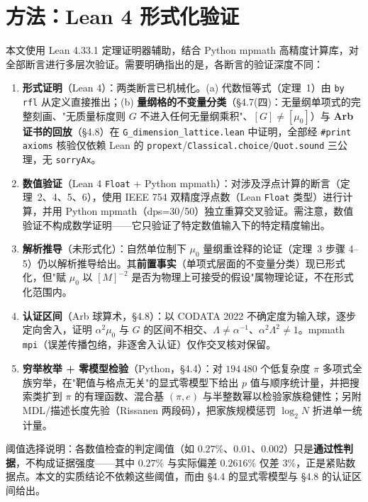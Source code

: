 \documentclass[12pt,a4paper]{article}
\begin{document}
\section{方法：Lean 4 形式化验证}

本文使用 Lean 4.33.1 定理证明器\cite{lean4}辅助，结合 Python mpmath 高精度计算库\cite{mpmath}，对全部断言进行多层次验证。需要明确指出的是，各断言的验证深度不同：

\begin{enumerate}
  \item \textbf{形式证明}（Lean 4）：两类断言已机械化。(a) 代数恒等式（定理~1）由 \texttt{by rfl} 从定义直接推出；(b) \textbf{量纲格的不变量分类}（§4.7(四)：无量纲单项式的完整刻画、"无质量标度则 $G$ 不进入任何无量纲乘积"、$[G]\neq[\mu_0]$）与 \textbf{Arb 证书的回放}（§4.8）在 \texttt{G\_\allowbreak{}dimension\_\allowbreak{}lattice.lean} 中证明，全部经 \texttt{\#print axioms} 核验仅依赖 Lean 的 \texttt{propext}/\texttt{Classical.choice}/\texttt{Quot.sound} 三公理，无 \texttt{sorryAx}。
  \item \textbf{数值验证}（Lean 4 \texttt{Float} + Python mpmath）：对涉及浮点计算的断言（定理~2、4、5、6），使用 IEEE 754 双精度浮点数（Lean \texttt{Float} 类型）进行计算，并用 Python mpmath（dps=30/50）独立重算交叉验证。需注意，数值验证不构成数学证明——它只验证了特定数值输入下的特定精度输出。
  \item \textbf{解析推导}（未形式化）：自然单位制下 $\mu_0$ 量纲重诠释的论证（定理~3 步骤 4--5）仍以解析推导给出。其\textbf{前置事实}（单项式层面的不变量分类）现已形式化，但"赋 $\mu_0$ 以 $[M]^{-2}$ 是否为物理上可接受的假设"属物理论证，不在形式化范围内。
  \item \textbf{认证区间}（Arb 球算术\cite{johansson2017}，§4.8）：以 CODATA 2022 不确定度为输入球，逐步定向舍入，证明 $\alpha^2\mu_0$ 与 $G$ 的区间不相交、$\Lambda \neq \alpha^{-1}$、$\alpha^2\Lambda^2 \neq 1$。mpmath \texttt{mpi}（误差传播包络，非逐舍入认证）仅作交叉核对保留。
  \item \textbf{穷举枚举 + 零模型检验}（Python，§4.4）：对 $194\,480$ 个低复杂度 $\pi$ 多项式全族穷举，在"靶值与格点无关"的显式零模型下给出 $p$ 值与顺序统计量，并把搜索类扩到 $\pi$ 的有理函数、混合基 $(\pi,e)$ 与半整数幂以检验家族稳健性；另附 MDL/描述长度先验（Rissanen 两段码），把家族规模惩罚 $\log_2 N$ 折进单一统计量。
\end{enumerate}

阈值选择说明：各数值检查的判定阈值（如 $0.27\%$、$0.01$、$0.002$）只是\textbf{通过性判据}，不构成证据强度——其中 $0.27\%$ 与实际偏差 $0.2616\%$ 仅差 $3\%$，正是紧贴数据点。本文的实质结论不依赖这些阈值，而由 §4.4 的显式零模型与 §4.8 的认证区间给出。
\end{document}
